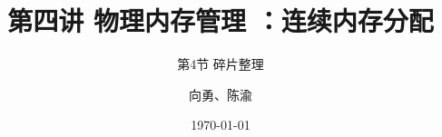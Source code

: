 


\title[第4讲]{第四讲 物理内存管理 ：连续内存分配} %
\subtitle{第4节 碎片整理}
\author{向勇、陈渝} %
\date{\today} %



\begin{frame}
\titlepage %
\end{frame}


